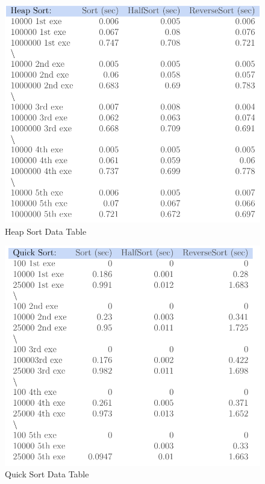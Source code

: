 \documentclass[12pt]{article}
\begin{document}
\begin{figure}[h]
	\centering
	\includegraphics[scale=.7]{HSdatatable.PNG}
	\caption{Heap Sort Data Table}
	\label{fig:mesh1}
\end{figure}
\begin{figure}[h]
	\centering
	\includegraphics[scale=.7]{QSdatatable.PNG}
	\caption{Quick Sort Data Table}
	\label{fig:mesh1}
\end{figure}
\end{document}
